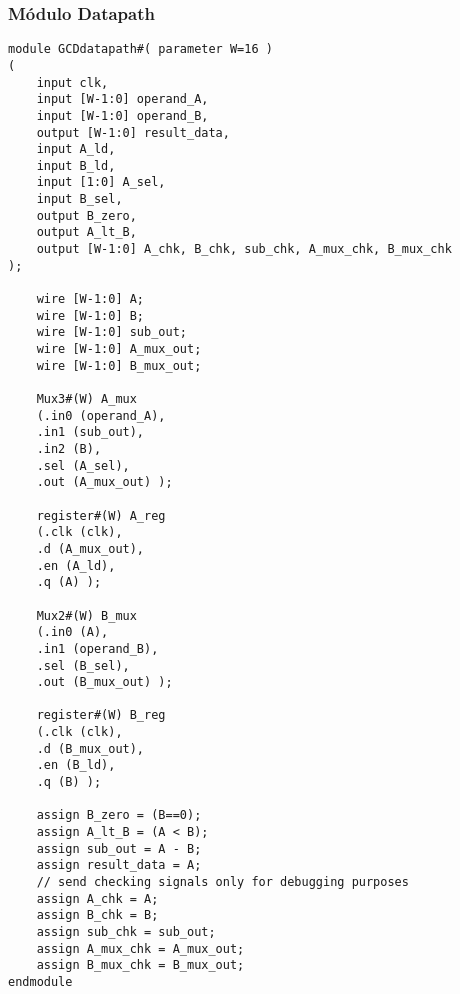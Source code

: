 \documentclass[a4paper,11pt]{article} %
\begin{document}
\subsubsection*{Módulo Datapath}
\begin{verbatim}
module GCDdatapath#( parameter W=16 )
(
    input clk,
    input [W-1:0] operand_A,
    input [W-1:0] operand_B,
    output [W-1:0] result_data,
    input A_ld,
    input B_ld,
    input [1:0] A_sel,
    input B_sel,
    output B_zero,
    output A_lt_B,
    output [W-1:0] A_chk, B_chk, sub_chk, A_mux_chk, B_mux_chk
);

    wire [W-1:0] A;
    wire [W-1:0] B;
    wire [W-1:0] sub_out;
    wire [W-1:0] A_mux_out;
    wire [W-1:0] B_mux_out;

    Mux3#(W) A_mux
    (.in0 (operand_A),
    .in1 (sub_out),
    .in2 (B),
    .sel (A_sel),
    .out (A_mux_out) );

    register#(W) A_reg
    (.clk (clk),
    .d (A_mux_out),
    .en (A_ld),
    .q (A) );

    Mux2#(W) B_mux
    (.in0 (A),
    .in1 (operand_B),
    .sel (B_sel),
    .out (B_mux_out) );

    register#(W) B_reg
    (.clk (clk),
    .d (B_mux_out),
    .en (B_ld),
    .q (B) );

    assign B_zero = (B==0);
    assign A_lt_B = (A < B);
    assign sub_out = A - B;
    assign result_data = A;
    // send checking signals only for debugging purposes
    assign A_chk = A;
    assign B_chk = B;
    assign sub_chk = sub_out;
    assign A_mux_chk = A_mux_out;
    assign B_mux_chk = B_mux_out;
endmodule
\end{verbatim}
\end{document}
